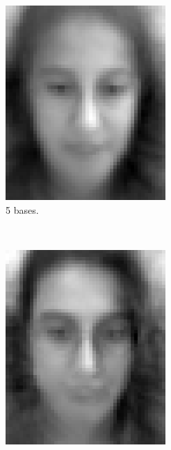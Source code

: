 \documentclass[a4paper, 10pt, conference]{ieeeconf}
\begin{document}
\begin{figure}[!ht]
\begin{subfigure}{0.1\textwidth}
          \includegraphics[width=\textwidth]{src/reface31.png}
          \caption{5 bases.}
        \end{subfigure}
        ~
        \begin{subfigure}{0.1\textwidth}
          \includegraphics[width=\textwidth]{src/reface32.png}

\end{subfigure}
\end{figure}
\end{document}
